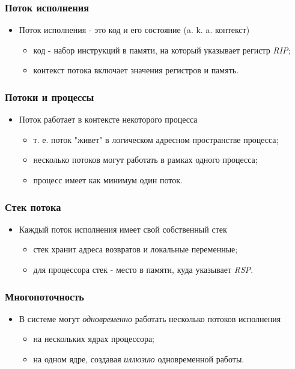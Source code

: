 \begin{frame}
\frametitle{Поток исполнения}
\begin{itemize}
    \item<1->Поток исполнения - это код и его состояние (a. k. a. контекст)
    \begin{itemize}
       \item<2->код - набор инструкций в памяти, на который
       указывает регистр \emph{RIP};
       \item<3->контекст потока включает значения регистров и память.
    \end{itemize}
\end{itemize}
\end{frame}

\begin{frame}
\frametitle{Потоки и процессы}
\begin{itemize}
    \item<1->Поток работает в контексте некоторого процесса
    \begin{itemize}
        \item<2->т. е. поток "живет" в логическом адресном пространстве процесса;
        \item<3->несколько потоков могут работать в рамках одного процесса;
        \item<4->процесс имеет как минимум один поток.
    \end{itemize}
\end{itemize}
\end{frame}

\begin{frame}
\frametitle{Стек потока}
\begin{itemize}
    \item<1->Каждый поток исполнения имеет свой собственный стек
    \begin{itemize}
        \item<2->стек хранит адреса возвратов и локальные переменные;
        \item<3->для процессора стек - место в памяти, куда указывает
        \emph{RSP}.
    \end{itemize}
\end{itemize}
\end{frame}

\begin{frame}
\frametitle{Многопоточность}
\begin{itemize}
    \item<1->В системе могут \emph{одновременно} работать несколько
    потоков исполнения
    \begin{itemize}
        \item<2->на нескольких ядрах процессора;
        \item<3->на одном ядре, создавая \emph{иллюзию} одновременной работы.
    \end{itemize}
\end{itemize}
\end{frame}

